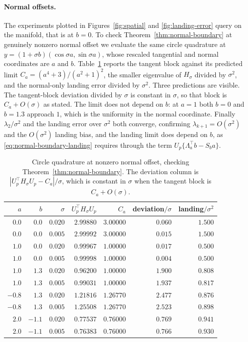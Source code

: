 \paragraph{Normal offsets.}
The experiments plotted in Figures~\ref{fig:spatial} and \ref{fig:landing-error} query on the manifold, that is at $b=0$.  To check Theorem~\ref{thm:normal-boundary} at genuinely nonzero normal offset we evaluate the same circle quadrature at
$y=(1+\sigma b)(\cos\sigma a,\sin\sigma a)$, whose rescaled tangential and normal
coordinates are $a$ and $b$.  Table~\ref{tab:normal-offset} reports the tangent
block against its predicted limit $C_a=(a^4+3)/(a^2+1)^2$, the smaller
eigenvalue of $H_\sigma$ divided by $\sigma^2$, and the normal-only landing
error divided by $\sigma^2$.  Three predictions are visible.  The tangent-block
deviation divided by $\sigma$ is constant in $\sigma$, so that block is
$C_a+O(\sigma)$ as stated.  The limit does not depend on $b$: at $a=1$ both
$b=0$ and $b=1.3$ approach $1$, which is the uniformity in the normal
coordinate.  Finally $\lambda_2/\sigma^2$ and the landing error over $\sigma^2$
both converge, confirming $\lambda_{k+1}=O(\sigma^2)$ and the $O(\sigma^2)$
landing bias, and the landing limit does depend on $b$, as
\eqref{eq:normal-boundary-landing} requires through the term
$U_p\{\Lambda_a^\top b-S_ba\}$.

\begin{table}[!htbp]
  \centering
  \caption{Circle quadrature at nonzero normal offset, checking Theorem~\ref{thm:normal-boundary}.  The deviation column is $|U_p^\top H_\sigma U_p-C_a|/\sigma$, which is constant in $\sigma$ when the tangent block is $C_a+O(\sigma)$.}
  \label{tab:normal-offset}
  \small
  \begin{tabular}{@{}rrrrrrr@{}}
    \toprule
    $a$ & $b$ & $\sigma$ & $U_p^\top H_\sigma U_p$ & $C_a$
      & deviation$/\sigma$ & landing$/\sigma^2$ \\
    \midrule
    $0.0$ & $0.0$ & $0.020$ & $2.99880$ & $3.00000$ & $0.060$ & $1.500$ \\
    $0.0$ & $0.0$ & $0.005$ & $2.99992$ & $3.00000$ & $0.015$ & $1.500$ \\
    $1.0$ & $0.0$ & $0.020$ & $0.99967$ & $1.00000$ & $0.017$ & $0.500$ \\
    $1.0$ & $0.0$ & $0.005$ & $0.99998$ & $1.00000$ & $0.004$ & $0.500$ \\
    $1.0$ & $1.3$ & $0.020$ & $0.96200$ & $1.00000$ & $1.900$ & $0.808$ \\
    $1.0$ & $1.3$ & $0.005$ & $0.99031$ & $1.00000$ & $1.937$ & $0.817$ \\
    $-0.8$ & $1.3$ & $0.020$ & $1.21816$ & $1.26770$ & $2.477$ & $0.876$ \\
    $-0.8$ & $1.3$ & $0.005$ & $1.25508$ & $1.26770$ & $2.523$ & $0.898$ \\
    $2.0$ & $-1.1$ & $0.020$ & $0.77537$ & $0.76000$ & $0.769$ & $0.941$ \\
    $2.0$ & $-1.1$ & $0.005$ & $0.76383$ & $0.76000$ & $0.766$ & $0.930$ \\
    \bottomrule
  \end{tabular}
\end{table}

